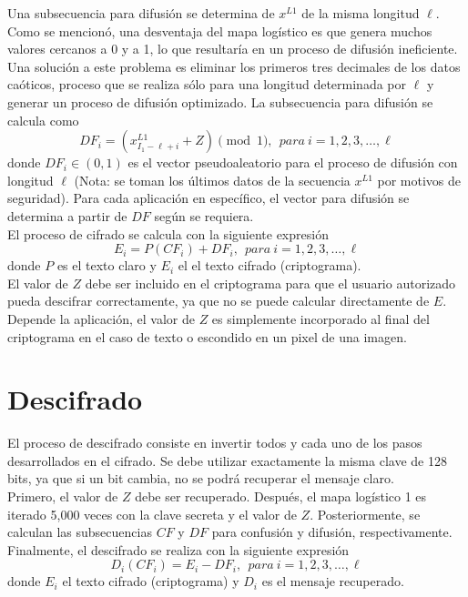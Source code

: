 Una subsecuencia para difusión se determina de $x^{L1}$ de la misma longitud $\ell$. Como se mencionó, una desventaja del mapa logístico es que genera muchos valores cercanos a 0 y a 1, lo que resultaría en un proceso de difusión ineficiente. Una solución a este problema es eliminar los primeros tres decimales de los datos caóticos, proceso que se realiza sólo para una longitud determinada por $\ell$ y generar un proceso de difusión optimizado. La subsecuencia para difusión se calcula como
\begin{equation}
DF_{i}=\left(x_{I_{1}-\ell +i}^{L1}+Z\right)\pmod 1, ~~  para ~i=1,2,3,\ldots ,\ell 
\end{equation}
donde $DF_{i}\in \left(0,1\right)$ es el vector pseudoaleatorio para el proceso de difusión con longitud $\ell$ (Nota: se toman los últimos datos de la secuencia $x^{L1}$ por motivos de seguridad). Para cada aplicación en específico, el vector para difusión se determina a partir de $DF$ según se requiera. \\

El proceso de cifrado se calcula con la siguiente expresión
\begin{equation}
E_{i}= P(CF_{i}) + DF_{i}, ~~  para ~i=1,2,3,\ldots ,\ell
\end{equation}
donde $P$ es el texto claro y $E_{i}$ el el texto cifrado (criptograma). \\

El valor de $Z$ debe ser incluido en el criptograma para que el usuario autorizado pueda descifrar correctamente, ya que no se puede calcular directamente de $E$. Depende la aplicación, el valor de $Z$ es simplemente incorporado al final del criptograma en el caso de texto o escondido en un pixel de una imagen.

\section{Descifrado}
El proceso de descifrado consiste en invertir todos y cada uno de los pasos desarrollados en el cifrado. Se debe utilizar exactamente la misma clave de 128 bits, ya que si un bit cambia, no se podrá recuperar el mensaje claro. \\

Primero, el valor de $Z$ debe ser recuperado. Después, el mapa logístico 1 es iterado 5,000 veces con la clave secreta y el valor de $Z$. Posteriormente, se calculan las subsecuencias $CF$ y $DF$ para confusión y difusión, respectivamente. Finalmente, el descifrado se realiza con la siguiente expresión
\begin{equation}
D_{i}(CF_{i})= E_{i} - DF_{i}, ~~  para ~i=1,2,3,\ldots ,\ell
\end{equation}
donde $E_{i}$ el texto cifrado (criptograma) y $D_{i}$ es el mensaje recuperado. 

